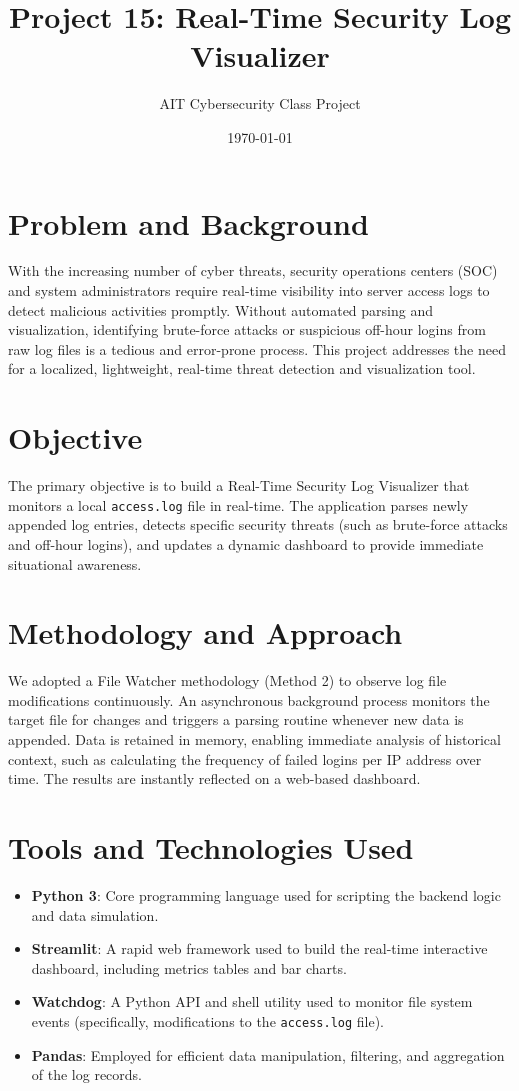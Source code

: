 \documentclass[12pt,a4paper]{article}
\title{Project 15: Real-Time Security Log Visualizer}
\author{AIT Cybersecurity Class Project}
\date{\today}
\begin{document}
\maketitle

\section{Problem and Background}
With the increasing number of cyber threats, security operations centers (SOC) and system administrators require real-time visibility into server access logs to detect malicious activities promptly. Without automated parsing and visualization, identifying brute-force attacks or suspicious off-hour logins from raw log files is a tedious and error-prone process. This project addresses the need for a localized, lightweight, real-time threat detection and visualization tool.

\section{Objective}
The primary objective is to build a Real-Time Security Log Visualizer that monitors a local \texttt{access.log} file in real-time. The application parses newly appended log entries, detects specific security threats (such as brute-force attacks and off-hour logins), and updates a dynamic dashboard to provide immediate situational awareness.

\section{Methodology and Approach}
We adopted a File Watcher methodology (Method 2) to observe log file modifications continuously. An asynchronous background process monitors the target file for changes and triggers a parsing routine whenever new data is appended. Data is retained in memory, enabling immediate analysis of historical context, such as calculating the frequency of failed logins per IP address over time. The results are instantly reflected on a web-based dashboard.

\section{Tools and Technologies Used}
\begin{itemize}
    \item \textbf{Python 3}: Core programming language used for scripting the backend logic and data simulation.
    \item \textbf{Streamlit}: A rapid web framework used to build the real-time interactive dashboard, including metrics tables and bar charts.
    \item \textbf{Watchdog}: A Python API and shell utility used to monitor file system events (specifically, modifications to the \texttt{access.log} file).
    \item \textbf{Pandas}: Employed for efficient data manipulation, filtering, and aggregation of the log records.
\end{itemize}
\end{document}
